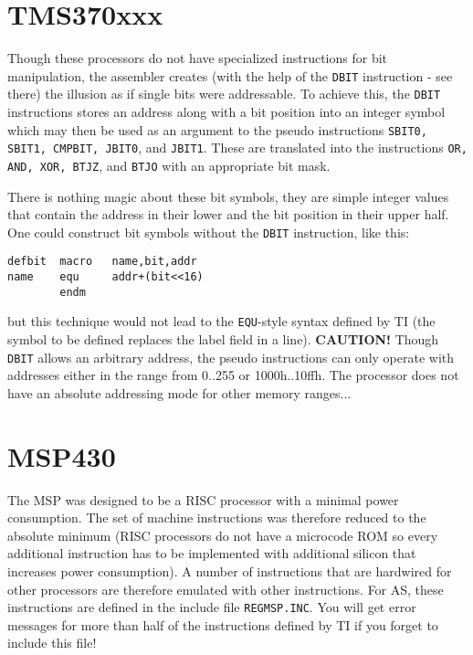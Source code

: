 \documentclass[12pt,twoside]{report}
\newcommand{\bb}[1]{{\bf #1}}
\newcommand{\tty}[1]{{\tt #1}}
\begin{document}

\section{TMS370xxx}

Though these processors do not have specialized instructions for bit
manipulation, the assembler creates (with the help of the \tty{DBIT}
instruction - see there) the illusion as if single bits were
addressable.  To achieve this, the \tty{DBIT} instructions stores an
address along with a bit position into an integer symbol which may
then be used as an argument to the pseudo instructions \tty{SBIT0, SBIT1,
CMPBIT, JBIT0}, and \tty{JBIT1}.  These are translated into the instructions
\tty{OR, AND, XOR, BTJZ}, and \tty{BTJO} with an appropriate bit mask.

There is nothing magic about these bit symbols, they are simple
integer values that contain the address in their lower and the bit
position in their upper half.  One could construct bit symbols
without the \tty{DBIT} instruction, like this:
\begin{verbatim}
defbit  macro   name,bit,addr
name    equ     addr+(bit<<16)
        endm
\end{verbatim}
but this technique would not lead to the \tty{EQU}-style syntax defined by
TI (the symbol to be defined replaces the label field in a line). 
\bb{CAUTION!} Though \tty{DBIT} allows an arbitrary address, the pseudo
instructions can only operate with addresses either in the range from
0..255 or 1000h..10ffh.  The processor does not have an absolute
addressing mode for other memory ranges...


\section{MSP430}
\label{MSPSpec}

The MSP was designed to be a RISC processor with a minimal power
consumption.  The set of machine instructions was therefore reduced
to the absolute minimum (RISC processors do not have a microcode ROM
so every additional instruction has to be implemented with additional
silicon that increases power consumption).  A number of instructions
that are hardwired for other processors are therefore emulated with
other instructions.  For AS, these instructions are defined in the
include file \tty{REGMSP.INC}.  You will get error messages for more than
half of the instructions defined by TI if you forget to include this
file!
\end{document}
